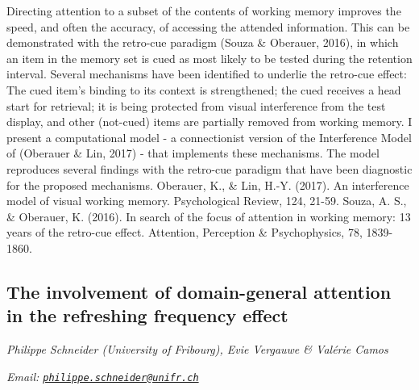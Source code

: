 \documentclass[12pt,]{book}
\begin{document}
Directing attention to a subset of the contents of working memory improves the speed, and often the accuracy, of accessing the attended information. This can be demonstrated with the retro-cue paradigm (Souza \& Oberauer, 2016), in which an item in the memory set is cued as most likely to be tested during the retention interval. Several mechanisms have been identified to underlie the retro-cue effect: The cued item's binding to its context is strengthened; the cued receives a head start for retrieval; it is being protected from visual interference from the test display, and other (not-cued) items are partially removed from working memory. I present a computational model - a connectionist version of the Interference Model of (Oberauer \& Lin, 2017) - that implements these mechanisms. The model reproduces several findings with the retro-cue paradigm that have been diagnostic for the proposed mechanisms.
Oberauer, K., \& Lin, H.-Y. (2017). An interference model of visual working memory. Psychological Review, 124, 21-59.
Souza, A. S., \& Oberauer, K. (2016). In search of the focus of attention in working memory: 13 years of the retro-cue effect. Attention, Perception \& Psychophysics, 78, 1839-1860.

\hypertarget{the-involvement-of-domain-general-attention-in-the-refreshing-frequency-effect}{%
\subsection{The involvement of domain-general attention in the refreshing frequency effect}\label{the-involvement-of-domain-general-attention-in-the-refreshing-frequency-effect}}

\emph{Philippe Schneider (University of Fribourg), Evie Vergauwe \& Valérie Camos}

\emph{Email: \href{mailto:philippe.schneider@unifr.ch}{\nolinkurl{philippe.schneider@unifr.ch}}}
\end{document}
